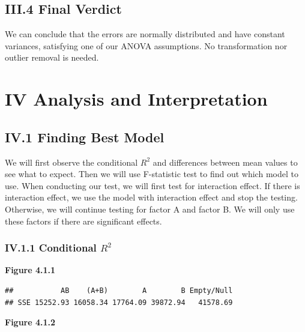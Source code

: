 \documentclass[
]{article}
\begin{document}
\subsection{III.4 Final Verdict}\label{iii.4-final-verdict}

We can conclude that the errors are normally distributed and have
constant variances, satisfying one of our ANOVA assumptions. No
transformation nor outlier removal is needed.

\section{IV Analysis and
Interpretation}\label{iv-analysis-and-interpretation}

\subsection{IV.1 Finding Best Model}\label{iv.1-finding-best-model}

We will first observe the conditional \(R^2\) and differences between
mean values to see what to expect. Then we will use F-statistic test to
find out which model to use. When conducting our test, we will first
test for interaction effect. If there is interaction effect, we use the
model with interaction effect and stop the testing. Otherwise, we will
continue testing for factor A and factor B. We will only use these
factors if there are significant effects.

\subsubsection{\texorpdfstring{IV.1.1 Conditional
\(R^2\)}{IV.1.1 Conditional R\^{}2}}\label{iv.1.1-conditional-r2}

\textbf{Figure 4.1.1}

\begin{verbatim}
##           AB    (A+B)        A        B Empty/Null
## SSE 15252.93 16058.34 17764.09 39872.94   41578.69
\end{verbatim}

\textbf{Figure 4.1.2}
\end{document}
